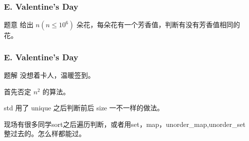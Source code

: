 \renewcommand{\problemname}{E. Valentine's Day}

\begin{frame}\frametitle{\problemname}
	
	\begin{block}{题意}
		给出 $n(n\le 10^{6})$ 朵花，每朵花有一个芳香值，判断有没有芳香值相同的花。
	\end{block}
\end{frame}

\begin{frame}\frametitle{\problemname}
	
	\begin{block}{题解}
		没想着卡人，温暖签到。

		首先否定 $n^2$ 的算法。

		std 用了 unique 之后判断前后 size 一不一样的做法。

		现场有很多同学sort之后遍历判断，或者用set，map，unorder\_map,unorder\_set整过去的。怎么样都能过。
	\end{block}
\end{frame}